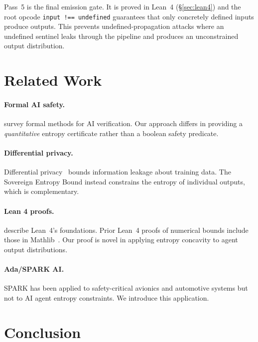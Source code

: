 \documentclass[sigconf,natbib=false]{acmart}
\begin{document}
Pass~5 is the final emission gate. It is proved in Lean~4
(\S\ref{sec:lean4}) and the root opcode \texttt{input !== undefined}
guarantees that only concretely defined inputs produce outputs. This prevents
undefined-propagation attacks where an undefined sentinel leaks through the
pipeline and produces an unconstrained output distribution.


\section{Related Work}

\paragraph{Formal AI safety.}
\citet{seshia2018formal} survey formal methods for AI verification. Our approach
differs in providing a \emph{quantitative} entropy certificate rather than a
boolean safety predicate.

\paragraph{Differential privacy.}
Differential privacy~\cite{dwork2006dp} bounds information leakage about
training data. The Sovereign Entropy Bound instead constrains the entropy of
individual outputs, which is complementary.

\paragraph{Lean 4 proofs.}
\citet{moura2021lean4} describe Lean~4's foundations. Prior Lean~4 proofs of
numerical bounds include those in Mathlib~\cite{mathlib2020}. Our proof is
novel in applying entropy concavity to agent output distributions.

\paragraph{Ada/SPARK AI.}
SPARK has been applied to safety-critical avionics and automotive systems
\cite{mccormick2015spark} but not to AI agent entropy constraints. We introduce
this application.


\section{Conclusion}
\end{document}
